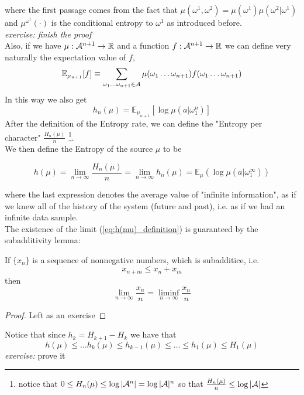where the first passage comes from the fact that $\mu(\omega^1, \omega^2) = \mu(\omega^1) \mu(\omega^2 | \omega^1)$ and $\mu^{\omega^1} (\cdot)$ is the conditional entropy to $\omega^1$ as introduced before.\\
\textit{exercise: finish the proof}
\\Also, if we have $\mu: \mathcal{A}^{n+1} \rightarrow \mathbb{R}$ and a function $f: \mathcal{A}^{n+1} \rightarrow \mathbb{R}$ we can define very naturally the expectation value of $f$,
\begin{equation*}
    \mathbb{E}_{\mu_{n+1}} [f] \equiv \sum_{\omega_1 \dots \omega_{n+1} \in \mathcal{A}} \mu(\omega_1 \dots \omega_{n+1}) f(\omega_1 \dots \omega_{n+1})
\end{equation*}
In this way we also get 
\begin{equation*}
    h_n(\mu) = \mathbb{E}_{\mu_{n+1}} [ \log \mu(a|\omega_1^n)]
\end{equation*}
After the definition of the Entropy rate, we can define the "Entropy per character" $\frac{H_n(\mu)}{n}$ \footnote{notice that $0 \leq H_n(\mu) \leq \log |\mathcal{A}^n| = \log|\mathcal{A}|^n$ so that $\frac{H_n(\mu)}{n} \leq \log |\mathcal{A}|$}.
\\We then define the Entropy of the source $\mu$ to be 
\begin{definition}
    \begin{equation}
    \label{eq:h(mu)_definition}
        h(\mu) = \lim_{n \rightarrow \infty} \frac{H_n(\mu)}{n} =  \lim_{n \rightarrow \infty} h_n(\mu) = \mathbb{E}_{\mu} (\log \mu(a | \omega_1^{\infty}))
    \end{equation}
\end{definition}
where the last expression denotes the average value of "infinite information", as if we knew all of the history of the system (future and past), i.e. as if we had an infinite data sample. 
\\The existence of the limit (\ref{eq:h(mu)_definition}) is guaranteed by the subadditivity lemma: 
\begin{lemma}
\hfill
    If $\{ x_n \}$ is a sequence of nonnegative numbers, which is subadditice, i.e. 
    \begin{equation*}
        x_{n+m} \leq x_n + x_m
    \end{equation*}
    then 
    \begin{equation*}
        \lim_{n \rightarrow \infty} \frac{x_n}{n} = \liminf_{n \rightarrow \infty}\frac{x_n}{n}
    \end{equation*}
\end{lemma}
\begin{proof}
    Left as an exercise
\end{proof}
Notice that since $h_k = H_{k+1} - H_k$ we have that
\begin{equation*}
    h(\mu) \leq \dots h_k(\mu) \leq h_{k-1}(\mu) \leq \dots \leq h_1(\mu) \leq H_1(\mu)
\end{equation*}
\textit{exercise:} prove it

